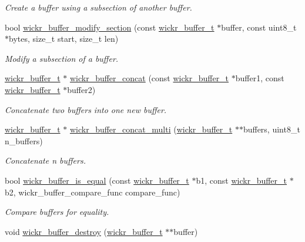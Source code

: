 \begin{DoxyCompactItemize}
\begin{DoxyCompactList}\small\item\em Create a buffer using a subsection of another buffer. \end{DoxyCompactList}\item 
bool \mbox{\hyperlink{group__wickr__buffer_ga67f817bf762e4ee401b31685197620be}{wickr\+\_\+buffer\+\_\+modify\+\_\+section}} (const \mbox{\hyperlink{structwickr__buffer}{wickr\+\_\+buffer\+\_\+t}} $\ast$buffer, const uint8\+\_\+t $\ast$bytes, size\+\_\+t start, size\+\_\+t len)
\begin{DoxyCompactList}\small\item\em Modify a subsection of a buffer. \end{DoxyCompactList}\item 
\mbox{\hyperlink{structwickr__buffer}{wickr\+\_\+buffer\+\_\+t}} $\ast$ \mbox{\hyperlink{group__wickr__buffer_gad7721c1033a1fc378a0a11613f3cfb26}{wickr\+\_\+buffer\+\_\+concat}} (const \mbox{\hyperlink{structwickr__buffer}{wickr\+\_\+buffer\+\_\+t}} $\ast$buffer1, const \mbox{\hyperlink{structwickr__buffer}{wickr\+\_\+buffer\+\_\+t}} $\ast$buffer2)
\begin{DoxyCompactList}\small\item\em Concatenate two buffers into one new buffer. \end{DoxyCompactList}\item 
\mbox{\hyperlink{structwickr__buffer}{wickr\+\_\+buffer\+\_\+t}} $\ast$ \mbox{\hyperlink{group__wickr__buffer_ga3aa7ea751a65310184d6c0ea9627dca8}{wickr\+\_\+buffer\+\_\+concat\+\_\+multi}} (\mbox{\hyperlink{structwickr__buffer}{wickr\+\_\+buffer\+\_\+t}} $\ast$$\ast$buffers, uint8\+\_\+t n\+\_\+buffers)
\begin{DoxyCompactList}\small\item\em Concatenate n buffers. \end{DoxyCompactList}\item 
bool \mbox{\hyperlink{group__wickr__buffer_ga51ec58848ab0b07d164c6f7d73200c24}{wickr\+\_\+buffer\+\_\+is\+\_\+equal}} (const \mbox{\hyperlink{structwickr__buffer}{wickr\+\_\+buffer\+\_\+t}} $\ast$b1, const \mbox{\hyperlink{structwickr__buffer}{wickr\+\_\+buffer\+\_\+t}} $\ast$b2, wickr\+\_\+buffer\+\_\+compare\+\_\+func compare\+\_\+func)
\begin{DoxyCompactList}\small\item\em Compare buffers for equality. \end{DoxyCompactList}\item 
void \mbox{\hyperlink{group__wickr__buffer_ga7ec1198db0739f3034ddd3969c64257f}{wickr\+\_\+buffer\+\_\+destroy}} (\mbox{\hyperlink{structwickr__buffer}{wickr\+\_\+buffer\+\_\+t}} $\ast$$\ast$buffer)

\end{DoxyCompactItemize}
